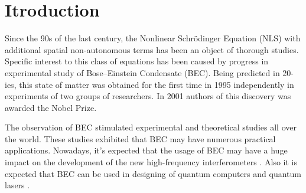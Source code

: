 \chapter*{Itroduction}
\label{introduction}

Since the 90s of the last century, the Nonlinear Schr\"odinger Equation (NLS) with additional spatial non-autonomous terms has been an object of thorough studies.
Specific interest to this class of equations has been caused by progress in experimental study of Bose--Einstein Condensate (BEC).
Being predicted in 20-ies\cite{Einstein, Bose}, this state of matter was obtained for the first time in 1995 independently in experiments of two groups of researchers\cite{WiemanCornell, Ketterle}.
In 2001 authors of this discovery was awarded the Nobel Prize.

The observation of BEC stimulated experimental and theoretical studies all over the world.
These studies exhibited that BEC may have numerous practical applications.
Nowadays, it's expected that the usage of BEC may have a huge impact on the development of the new high-frequency interferometers \cite{GrossZiboldNicklasEsteveOberthaler}.
Also it is expected that BEC can be used in designing of quantum computers \cite{JakschZoller} and quantum lasers \cite{GuerinRiouGaeblerJosseBouyerAspect}.

